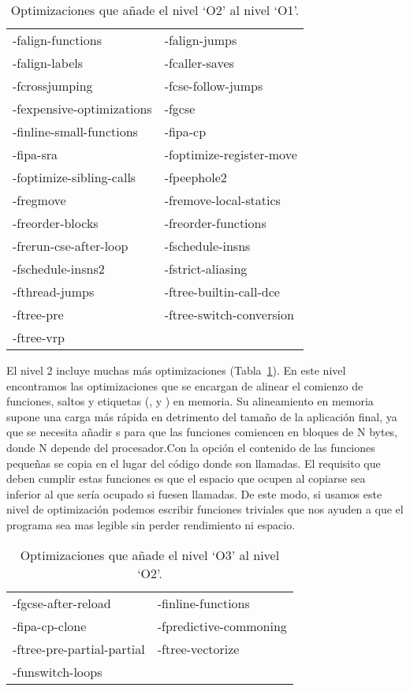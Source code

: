 \begin{table}[htb]
\begin{center}
	\begin{tabular}{ll}
		-falign-functions & -falign-jumps\\
		-falign-labels & -fcaller-saves\\
		-fcrossjumping & -fcse-follow-jumps\\
		-fexpensive-optimizations & -fgcse\\
		-finline-small-functions & -fipa-cp\\
		-fipa-sra & -foptimize-register-move\\
		-foptimize-sibling-calls & -fpeephole2\\
		-fregmove & -fremove-local-statics\\
		-freorder-blocks & -freorder-functions\\
		-frerun-cse-after-loop & -fschedule-insns\\
		-fschedule-insns2 & -fstrict-aliasing\\
		-fthread-jumps & -ftree-builtin-call-dce\\
		-ftree-pre & -ftree-switch-conversion\\
		-ftree-vrp & \\
	\end{tabular}
\end{center}
\caption{Optimizaciones que añade el nivel `O2' al nivel `O1'.}
\label{opt2}
\end{table}

El nivel 2 incluye muchas más optimizaciones (Tabla~\ref{opt2}). En este nivel encontramos las optimizaciones  que se encargan de alinear el comienzo de funciones, saltos y etiquetas (,  y ) en memoria. Su alineamiento en memoria supone una carga más rápida en detrimento del tamaño de la aplicación final, ya que se necesita añadir s para que las funciones comiencen en bloques de N bytes, donde N depende del procesador.Con la opción  el contenido de las funciones pequeñas se copia en el lugar del código donde son llamadas. El requisito que deben cumplir estas funciones es que el espacio que ocupen al copiarse sea inferior al que sería ocupado si fuesen llamadas. De este modo, si usamos este nivel de optimización podemos escribir funciones triviales que nos ayuden a que el programa sea mas legible sin perder rendimiento ni espacio.

\begin{table}[htb]
\begin{center}
	\begin{tabular}{ll}
		-fgcse-after-reload & -finline-functions\\
		-fipa-cp-clone & -fpredictive-commoning\\
		-ftree-pre-partial-partial & -ftree-vectorize\\
		-funswitch-loops & \\
	\end{tabular}
\end{center}
\caption{Optimizaciones que añade el nivel `O3' al nivel `O2'.}
\label{opt3}
\end{table}

